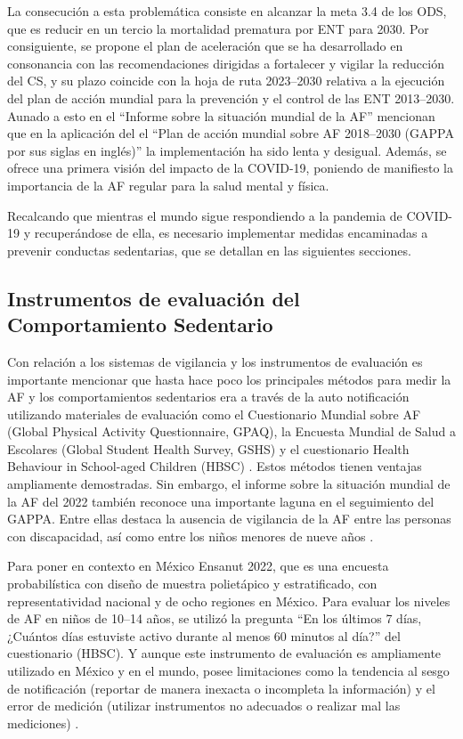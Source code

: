 La consecución a esta problemática consiste en alcanzar la meta 3.4 de los ODS, que es reducir en un tercio la mortalidad prematura por ENT para 2030. Por consiguiente, se propone el plan de aceleración que se ha desarrollado en consonancia con las recomendaciones dirigidas a fortalecer y vigilar la reducción del CS, y su plazo coincide con la hoja de ruta 2023--2030 relativa a la ejecución del plan de acción mundial para la prevención y el control de las ENT 2013--2030. Aunado a esto en el ``Informe sobre la situación mundial de la AF'' mencionan que en la aplicación del el ``Plan de acción mundial sobre AF 2018--2030 (GAPPA por sus siglas en inglés)'' \citep{WHO2022InformeActividad} la implementación ha sido lenta y desigual. Además, se ofrece una primera visión del impacto de la COVID-19, poniendo de manifiesto la importancia de la AF regular para la salud mental y física.

Recalcando que mientras el mundo sigue respondiendo a la pandemia de COVID-19 y recuperándose de ella, es necesario implementar medidas encaminadas a prevenir conductas sedentarias, que se detallan en las siguientes secciones.

\subsection{Instrumentos de evaluación del Comportamiento Sedentario}
\label{subsec:instrumentos_evaluacion}

Con relación a los sistemas de vigilancia y los instrumentos de evaluación es importante mencionar que hasta hace poco los principales métodos para medir la AF y los comportamientos sedentarios era a través de la auto notificación utilizando materiales de evaluación como el Cuestionario Mundial sobre AF (Global Physical Activity Questionnaire, GPAQ), la Encuesta Mundial de Salud a Escolares (Global Student Health Survey, GSHS) y el cuestionario Health Behaviour in School-aged Children (HBSC) \citep{CDC_GSHS,WHO2020}. Estos métodos tienen ventajas ampliamente demostradas. Sin embargo, el informe sobre la situación mundial de la AF del 2022 también reconoce una importante laguna en el seguimiento del GAPPA. Entre ellas destaca la ausencia de vigilancia de la AF entre las personas con discapacidad, así como entre los niños menores de nueve años \citep{WHO2022InformeActividad}.

Para poner en contexto en México Ensanut 2022, que es una encuesta probabilística con diseño de muestra polietápico y estratificado, con representatividad nacional y de ocho regiones en México. Para evaluar los niveles de AF en niños de 10--14 años, se utilizó la pregunta ``En los últimos 7 días, ¿Cuántos días estuviste activo durante al menos 60 minutos al día?'' del cuestionario (HBSC). Y aunque este instrumento de evaluación es ampliamente utilizado en México y en el mundo, posee limitaciones como la tendencia al sesgo de notificación (reportar de manera inexacta o incompleta la información) y el error de medición (utilizar instrumentos no adecuados o realizar mal las mediciones) \citep{Romero2022}.

